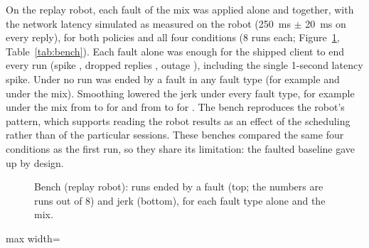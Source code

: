 On the replay robot, each fault of the mix was applied alone and together, with the network latency simulated as
measured on the robot (250~ms $\pm$ 20~ms on every reply), for both policies and all four conditions (8 runs each;
Figure~\ref{fig:bench}, Table~\ref{tab:bench}). Each fault alone was enough for the shipped client to end every
\smolvla{} run (spike , dropped replies , outage
), including the single 1-second latency spike. Under \drtc{} no run was ended by
a fault in any fault type (for example  and  under the
mix). Smoothing lowered the jerk under every fault type, for example under the mix from 
to  for \smolvla{} and from  to
 for \groot. The bench reproduces the robot's pattern, which supports reading the robot
results as an effect of the scheduling rather than of the particular sessions. These benches compared the same four
conditions as the first run, so they share its limitation: the faulted baseline gave up by design.

\begin{figure}[htbp]
  \centering
  \caption{Bench (replay robot): runs ended by a fault (top; the numbers are runs out of 8) and jerk (bottom), for each
           fault type alone and the mix.}
  \label{fig:bench}
\end{figure}

\begin{table}[htbp]
  \centering
  \small
  \begin{adjustbox}{max width=\textwidth}
  \end{adjustbox}
  \caption{Bench results per fault type: runs ended by a fault (out of 8), stall fraction and jerk (medians).}\label{tab:bench}
\end{table}

